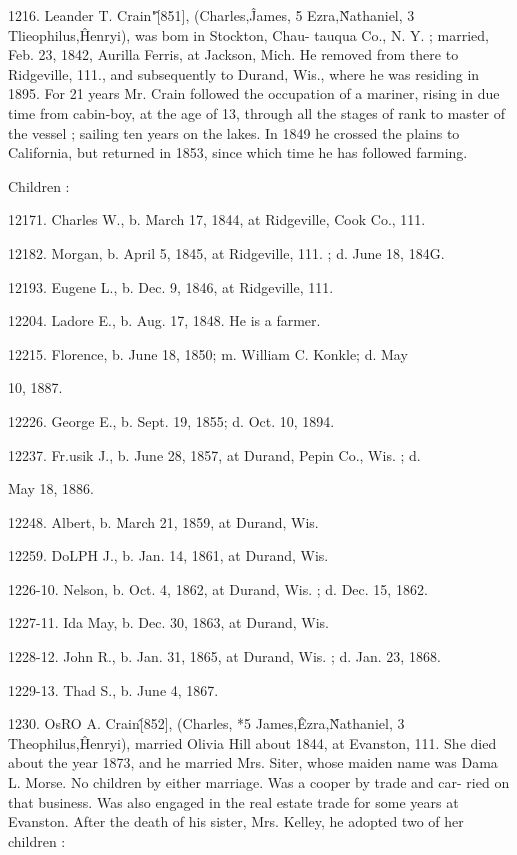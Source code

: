 \documentclass{book}
\begin{document}
1216. Leander T. Crain"\^ [851], (Charles,\^ James, 5 Ezra,\^ 
Nathaniel, 3 Tlieophilus,\^ Henryi), was bom in Stockton, Chau- 
tauqua Co., N. Y. ; married, Feb. 23, 1842, Aurilla Ferris, at 
Jackson, Mich. He removed from there to Ridgeville, 111., and 
subsequently to Durand, Wis., where he was residing in 1895. 
For 21 years Mr. Crain followed the occupation of a mariner, 
rising in due time from cabin-boy, at the age of 13, through all 
the stages of rank to master of the vessel ; sailing ten years on 
the lakes. In 1849 he crossed the plains to California, but 
returned in 1853, since which time he has followed farming. 

Children : 

12171. Charles W., b. March 17, 1844, at Ridgeville, Cook Co., 111. 

12182. Morgan, b. April 5, 1845, at Ridgeville, 111. ; d. June 18, 184G. 

12193. Eugene L., b. Dec. 9, 1846, at Ridgeville, 111. 

12204. Ladore E., b. Aug. 17, 1848. He is a farmer. 

12215. Florence, b. June 18, 1850; m. William C. Konkle; d. May 

10, 1887. 

12226. George E., b. Sept. 19, 1855; d. Oct. 10, 1894. 

12237. Fr.usik J., b. June 28, 1857, at Durand, Pepin Co., Wis. ; d. 

May 18, 1886. 

12248. Albert, b. March 21, 1859, at Durand, Wis. 

12259. DoLPH J., b. Jan. 14, 1861, at Durand, Wis. 

1226-10. Nelson, b. Oct. 4, 1862, at Durand, Wis. ; d. Dec. 15, 1862. 

1227-11. Ida May, b. Dec. 30, 1863, at Durand, Wis. 

1228-12. John R., b. Jan. 31, 1865, at Durand, Wis. ; d. Jan. 23, 1868. 

1229-13. Thad S., b. June 4, 1867. 

1230. OsRO A. Crain\^ [852], (Charles, *5 James,\^ Ezra,\^ 
Nathaniel, 3 Theophilus,\^ Henryi), married Olivia Hill about 
1844, at Evanston, 111. She died about the year 1873, and he 
married Mrs. Siter, whose maiden name was Dama L. Morse. 
No children by either marriage. Was a cooper by trade and car- 
ried on that business. Was also engaged in the real estate trade 
for some years at Evanston. After the death of his sister, Mrs. 
Kelley, he adopted two of her children : 
\end{document}
